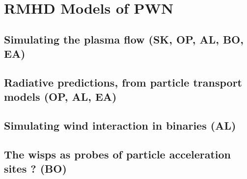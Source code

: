 \section{RMHD Models of PWN}
\subsection{Simulating the plasma flow         (SK, OP, AL, BO, EA)}
\subsection{Radiative predictions, from particle transport models      (OP, AL, EA)}
\subsection{Simulating wind interaction in binaries             (AL)}
\subsection{The wisps as probes of  particle acceleration sites ? (BO)}
